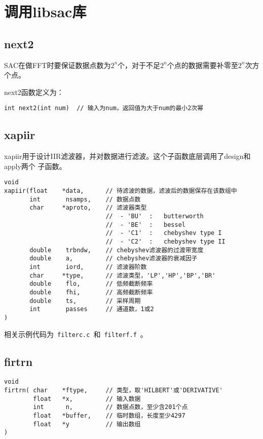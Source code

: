 \section{调用libsac库}
\subsection{next2}
SAC在做FFT时要保证数据点数为$2^n$个，对于不足$2^n$个点的数据需要补零至$2^n$次方个点。

next2函数定义为：
\begin{verbatim}
int next2(int num)  // 输入为num，返回值为大于num的最小2次幂
\end{verbatim}

\subsection{xapiir}
xapiir用于设计IIR滤波器，并对数据进行滤波。这个子函数底层调用了design和apply两个
子函数。
\begin{verbatim}
void
xapiir(float    *data,      // 待滤波的数据，滤波后的数据保存在该数组中
       int       nsamps,    // 数据点数
       char     *aproto,    // 滤波器类型
                            //  - 'BU'  :   butterworth
                            //  - 'BE'  :   bessel
                            //  - 'C1'  :   chebyshev type I
                            //  - 'C2'  :   chebyshev type II
       double    trbndw,    // chebyshev滤波器的过渡带宽度
       double    a,         // chebyshev滤波器的衰减因子
       int       iord,      // 滤波器阶数
       char     *type,      // 滤波类型，'LP','HP','BP','BR'
       double    flo,       // 低频截断频率
       double    fhi,       // 高频截断频率
       double    ts,        // 采样周期
       int       passes     // 通道数，1或2
)
\end{verbatim}

相关示例代码为~\verb+filterc.c+~和~\verb+filterf.f+~。

\subsection{firtrn}
\begin{verbatim}
void
firtrn( char    *ftype,     // 类型，取'HILBERT'或'DERIVATIVE'
        float   *x,         // 输入数据
        int      n,         // 数据点数，至少含201个点
        float   *buffer,    // 临时数组，长度至少4297
        float   *y          // 输出数组
)
\end{verbatim}

